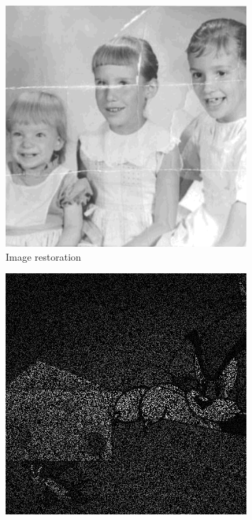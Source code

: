 \begin{figure}[t]
	\centering
	\begin{subfigure}{.5\columnwidth}
	   \centering
	   \includegraphics[width=.9\columnwidth]{graphics/3children_original_cropped.png}%
	      \caption{Image restoration
	      \label{fig:apps:image_restoration}
	   }
	\end{subfigure}\hfill%
	\begin{subfigure}{.5\columnwidth}
	   \centering
	   \includegraphics[width=.9\columnwidth]{graphics/TomAndJerry_512x512_pepper_in.png}%

\end{subfigure}
\end{figure}
